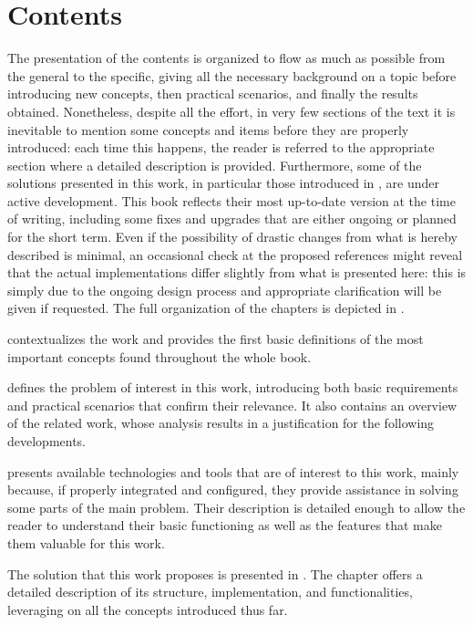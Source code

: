 \section*{Contents}
The presentation of the contents is organized to flow as much as possible from the general to the specific, giving all the necessary background on a topic before introducing new concepts, then practical scenarios, and finally the results obtained. Nonetheless, despite all the effort, in very few sections of the text it is inevitable to mention some concepts and items before they are properly introduced: each time this happens, the reader is referred to the appropriate section where a detailed description is provided. Furthermore, some of the solutions presented in this work, in particular those introduced in , are under active development. This book reflects their most up-to-date version at the time of writing, including some fixes and upgrades that are either ongoing or planned for the short term. Even if the possibility of drastic changes from what is hereby described is minimal, an occasional check at the proposed references might reveal that the actual implementations differ slightly from what is presented here: this is simply due to the ongoing design process and appropriate clarification will be given if requested. The full organization of the chapters is depicted in .

 contextualizes the work and provides the first basic definitions of the most important concepts found throughout the whole book.

 defines the problem of interest in this work, introducing both basic requirements and practical scenarios that confirm their relevance. It also contains an overview of the related work, whose analysis results in a justification for the following developments.

 presents available technologies and tools that are of interest to this work, mainly because, if properly integrated and configured, they provide assistance in solving some parts of the main problem. Their description is detailed enough to allow the reader to understand their basic functioning as well as the features that make them valuable for this work.

The solution that this work proposes is presented in . The chapter offers a detailed description of its structure, implementation, and functionalities, leveraging on all the concepts introduced thus far.

